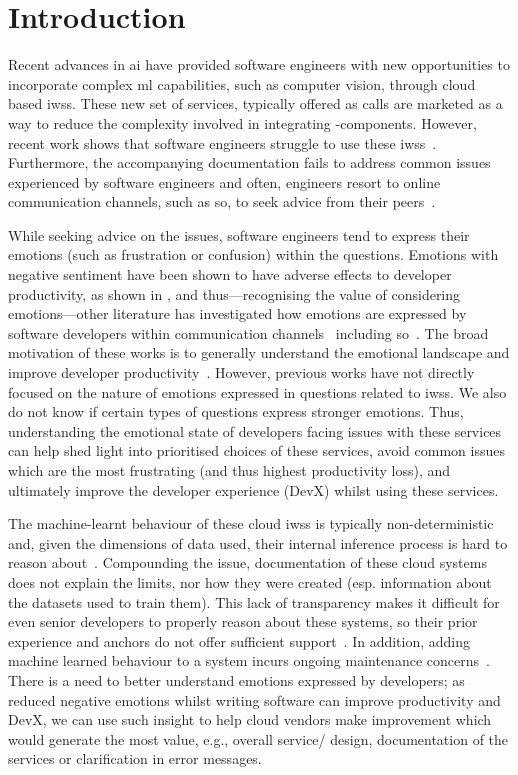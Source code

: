 \section{Introduction}
Recent advances in \gls{ai} have provided software engineers with new opportunities to incorporate complex \gls{ml} capabilities, such as computer vision, through cloud based \glspl{iws}. These new set of services, typically offered as  calls are marketed as a way to reduce the complexity involved in integrating -components. However, recent work shows that software engineers struggle to use these \glspl{iws}~\citep{Cummaudo:2020icse}. 
Furthermore, the accompanying documentation fails to address common issues experienced by software engineers and often, engineers resort to online communication channels, such as \gls{so}, to seek advice from their peers~\citep{Cummaudo:2020icse}.

While seeking advice on the issues, software engineers tend to express their emotions (such as frustration or confusion) within the questions. Emotions with negative sentiment have been shown to have adverse effects to developer productivity, as shown in \citep{wrobel2013}, and thus---recognising the value of considering emotions---other literature has investigated how emotions are expressed by software developers within communication channels~\citep{ortu2016} including \gls{so}~\citep{novielli2018, calefato2018}. The broad motivation of these works is to generally understand the emotional landscape and improve developer productivity~\citep{murgia2014, ortu2016, gachechiladze2017}. However, previous works have not directly focused on the nature of emotions expressed in questions related to \glspl{iws}. We also do not know if certain types of questions express stronger emotions. Thus, understanding the emotional state of developers facing issues with these services can help shed light into prioritised choices of these services, avoid common issues which are the most frustrating (and thus highest productivity loss), and ultimately improve the developer experience (DevX) whilst using these services.

The machine-learnt behaviour of these cloud \glspl{iws} is typically non-deterministic and, given the dimensions of data used, their internal inference process is hard to reason about~\citep{Cummaudo:2019icsme}. Compounding the issue, documentation of these cloud systems does not explain the limits, nor how they were created (esp. information about the datasets used to train them). This lack of transparency makes it difficult for even senior developers to properly reason about these systems, so their prior experience and anchors do not offer sufficient support~\citep{Cummaudo:2020icse}. In addition, adding machine learned behaviour to a system incurs ongoing maintenance concerns~\citep{Sculley2015}. There is a need to better understand emotions expressed by developers; as reduced negative emotions whilst writing software can improve productivity \citep{wrobel2013} and DevX, we can use such insight to help cloud vendors make improvement which would generate the most value, e.g., overall service/ design, documentation of the services or clarification in error messages.

